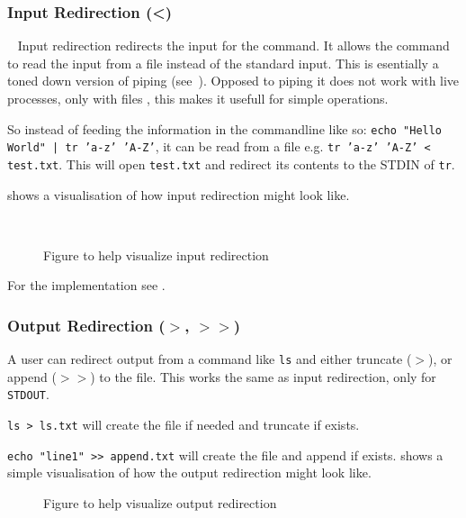 \documentclass[12pt,english]{article}
\begin{document}
\subsubsection{Input Redirection (<)}~\label{sec:inputRedirection}
Input redirection redirects the input
for the command. It allows the command to read the input
from a file instead of the standard input.
This is esentially a toned down version of piping
(see~). Opposed to
piping it does not work with live processes, only with files
, this makes it usefull for simple operations.

\medskip
So instead of feeding the information
in the commandline like so: \texttt{echo "Hello World" | tr 'a-z' 'A-Z'},
it can be read from a file e.g.
\texttt{tr 'a-z' 'A-Z' < test.txt}. 
This will open \texttt{test.txt} and redirect its contents to the \textsc{STDIN} of \texttt{tr}.

  shows a visualisation of how input redirection might look like.
\begin{figure}[!htb]
  \centering
  
  \caption{Figure to help visualize input redirection}~\label{fig:inputRedirection}
\end{figure}

For the implementation see
.

\subsubsection{Output Redirection \texorpdfstring{($>$, $>>$)}{(>, >>)}}\label{sec:outputRedirection}
A user can redirect output from a command like \texttt{ls} and
either truncate (\texttt{$>$}), or append (\texttt{$>>$}) to the file. This works the same as
input redirection, only for \texttt{STDOUT}.

\texttt{ls > ls.txt} will create the file if needed
and truncate if exists.


\texttt{echo "line1" >> append.txt}
will create the file and append if exists.
 shows a simple visualisation of how
the output redirection might look like.

\begin{figure}[!htb]
  \centering
  
  \caption{Figure to help visualize output redirection}
  \label{fig:outputRedirection}
\end{figure}
\end{document}

